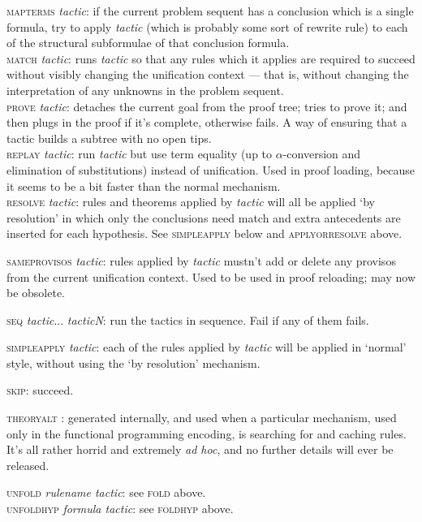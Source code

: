 \textsc{mapterms} \textit{tactic}: if the current problem sequent has a conclusion which is a single formula, try to apply \textit{tactic} (which is probably some sort of rewrite rule) to each of the structural subformulae of that conclusion formula.\\
\textsc{match} \textit{tactic}: runs \textit{tactic} so that any rules which it applies are required to succeed without visibly changing the unification context --- that is, without changing the interpretation of any unknowns in the problem sequent.\\
\textsc{prove} \textit{tactic}: detaches the current goal from the proof tree; tries to prove it; and then plugs in the proof if it's complete, otherwise fails. A way of ensuring that a tactic builds a subtree with no open tips.\\
\textsc{replay} \textit{tactic}: run \textit{tactic} but use term equality (up to \ensuremath{\alpha}-conversion and elimination of substitutions) instead of unification. Used in proof loading, because it seems to be a bit faster than the normal mechanism.\\
\textsc{resolve} \textit{tactic}: rules and theorems applied by \textit{tactic} will all be applied `by resolution' in which only the conclusions need match and extra antecedents are inserted for each hypothesis. See \textsc{simpleapply} below and \textsc{applyorresolve} above.


\textsc{sameprovisos} \textit{tactic}: rules applied by \textit{tactic} mustn't add or delete any provisos from the current unification context. Used to be used in proof reloading; may now be obsolete.


\textsc{seq} \textit{tactic}... \textit{tacticN}: run the tactics in sequence. Fail if any of them fails.


\textsc{simpleapply} \textit{tactic}: each of the rules applied by \textit{tactic} will be applied in `normal' style, without using the `by resolution' mechanism.


\textsc{skip}: succeed.


\textsc{theoryalt} : generated internally, and used when a particular mechanism, used only in the functional programming encoding, is searching for and caching rules. It's all rather horrid and extremely \textit{ad hoc}, and no further details will ever be released.


\textsc{unfold} \textit{rulename tactic}: see \textsc{fold} above.\\
\textsc{unfoldhyp} \textit{formula tactic}: see \textsc{foldhyp} above.


